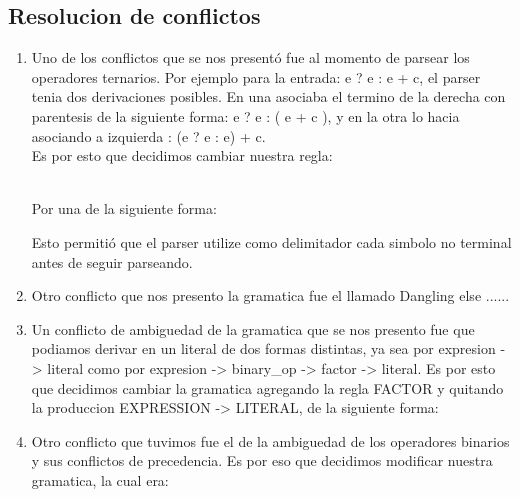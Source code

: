 \subsection{Resolucion de conflictos}
\begin{enumerate}
    
\item Uno de los conflictos que se nos presentó fue al momento de parsear los
operadores ternarios. Por ejemplo para la entrada: e ? e : e + c, el parser
tenia dos derivaciones posibles. En una asociaba el termino de la derecha con
parentesis de la siguiente forma: e ? e : ( e + c ), y en la otra lo hacia
asociando a izquierda : (e ? e : e) + c. \\
Es por esto que decidimos cambiar nuestra regla: 
\\
\begin{reglas}
\\
Por una de la siguiente forma:
\\
\end{reglas}
Esto permitió que el parser utilize como delimitador cada simbolo no terminal
antes de seguir parseando.

\TODO
\item Otro conflicto que nos presento la gramatica fue el llamado Dangling else
  ......

\item Un conflicto de ambiguedad de la gramatica que se nos presento fue que
  podiamos derivar en un literal de dos formas distintas, ya sea por expresion -> literal
  como por expresion -> binary\_op -> factor -> literal. Es por esto que decidimos cambiar la
  gramatica agregando la regla FACTOR y quitando la produccion EXPRESSION ->
  LITERAL, de la siguiente forma:
  \begin{reglas} 
  \end{reglas}

\item Otro conflicto que tuvimos fue el de la ambiguedad de los operadores
  binarios y sus conflictos de precedencia. Es por eso que decidimos modificar
  nuestra gramatica, la cual era:


\end{enumerate}
